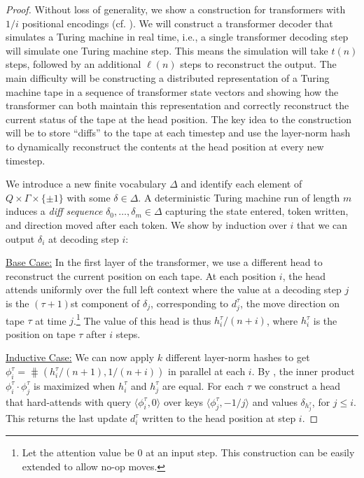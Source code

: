 \begin{proof}
    Without loss of generality, we show a construction for transformers with $1/i$ positional encodings (cf. ).
    We will construct a transformer decoder that simulates a Turing machine in real time, i.e., a single transformer decoding step will simulate one Turing machine step. This means the simulation will take $t(n)$ steps, followed by an additional $\ell(n)$ steps to reconstruct the output. The main difficulty will be constructing a distributed representation of a Turing machine tape in a sequence of transformer state vectors and showing how the transformer can both maintain this representation and correctly reconstruct the current status of the tape at the head position. The key idea to the construction will be to store ``diffs'' to the tape at each timestep and use the layer-norm hash to dynamically reconstruct the contents at the head position at every new timestep.

    We introduce a new finite vocabulary $\Delta$ and identify each element of $Q \times \Gamma \times \{\pm 1 \}$ with some $\delta \in \Delta$. A deterministic Turing machine run of length $m$ induces a \emph{diff sequence} $\delta_0, \ldots, \delta_m \in \Delta$ capturing the state entered, token written, and direction moved after each token.
    We show by induction over $i$ that we can output $\delta_i$ at decoding step $i$:

        \underline{Base Case:} In the first layer of the transformer, we use a different head to reconstruct the current position on each tape. At each position $i$, the head attends uniformly over the full left context where the value at a decoding step $j$ is the $(\tau + 1)$st component of $\delta_j$, corresponding to $d^\tau_j$, the move direction on tape $\tau$ at time $j$.\footnote{Let the attention value be $0$ at an input step. This construction can be easily extended to allow no-op moves.} The value of this head is thus $h^\tau_i/(n+i)$, where $h^\tau_i$ is the position on tape $\tau$ after $i$ steps.

        \underline{Inductive Case:} We can now apply $k$ different layer-norm hashes to get $\phi^\tau_i = \hash(h^\tau_i/(n+1), 1/(n+i))$ in parallel at each $i$. By , the inner product $\phi^\tau_i \cdot \phi^\tau_j$ is maximized when $h^\tau_i$ and $h^\tau_j$ are equal. For each $\tau$ we construct a head that hard-attends with query $\langle \phi^\tau_i, 0 \rangle$ over keys $\langle \phi^\tau_j, -1/j \rangle$ and values $\delta_{h^\tau_j}$, for $j \leq i$. This returns the last update $d^\tau_i$ written to the head position at step $i$.


\end{proof}
